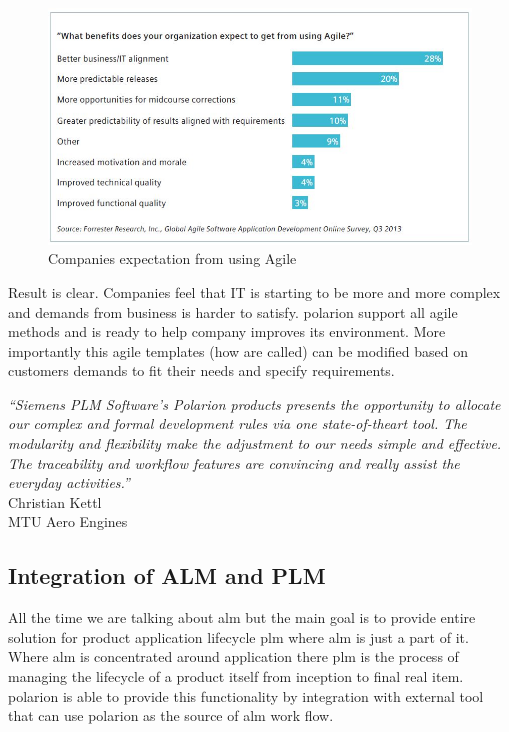 \documentclass[thesis=M,english]{FITthesis}[2012/06/26]
\begin{document}
\begin{figure}[h!]\centering
	\includegraphics[width=1\textwidth]{pictures/agile_benefits}
	\caption{Companies expectation from using Agile\cite{polarion_alm}}\label{fig:agile_benefits}
\end{figure}

Result is clear. Companies feel that IT is starting to be more and more complex and demands from business is harder to satisfy. \acrshort{polarion} support all agile methods and is ready to help company improves its environment. More importantly this agile templates (how are called) can be modified based on customers demands to fit their needs and specify requirements.

\begin{center}
	\textit{“Siemens PLM Software’s Polarion
		products presents the opportunity to
		allocate our complex and formal
		development rules via one state-of-theart
		tool. The modularity and flexibility
		make the adjustment to our needs simple
		and effective. The traceability and
		workflow features are convincing and
		really assist the everyday activities.”}\\
Christian Kettl\\
MTU Aero Engines\\
\end{center}

\subsection{Integration of ALM and PLM}

All the time we are talking about \acrshort{alm} but the main goal is to provide entire solution for product application lifecycle \acrshort{plm} where \acrshort{alm} is just a part of it. Where \acrshort{alm} is concentrated around application there \acrshort{plm} is the process of managing the lifecycle of a product itself from inception to final real item. \acrshort{polarion} is able to provide this functionality by integration with external tool that can use \acrshort{polarion} as the source of \acrshort{alm} work flow.\\
\end{document}
